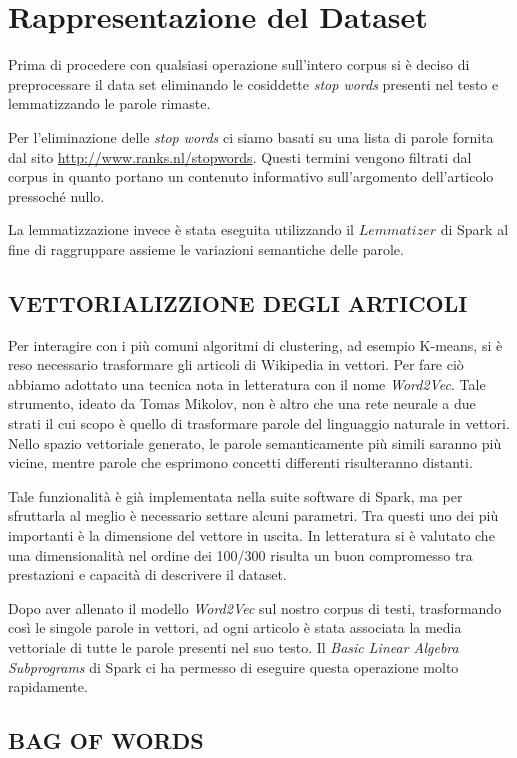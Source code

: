 \documentclass[
	12pt, %
	a4paper, %
	oneside, %
	headinclude,footinclude, %
	BCOR5mm, %
]{scrartcl}
\begin{document}
\section{Rappresentazione del Dataset}
	Prima di procedere con qualsiasi operazione sull'intero corpus si è deciso di preprocessare il data set eliminando le cosiddette \emph{stop words} presenti nel testo e lemmatizzando le parole rimaste.

	Per l'eliminazione delle \emph{stop words} ci siamo basati su una lista di parole fornita dal sito \url{http://www.ranks.nl/stopwords}.
	Questi termini vengono filtrati dal corpus in quanto portano un contenuto informativo sull'argomento dell'articolo pressoch\'{e} nullo.

	La lemmatizzazione invece è stata eseguita utilizzando il $Lemmatizer$ di Spark al fine di raggruppare assieme le variazioni semantiche delle parole.

	\subsection{VETTORIALIZZIONE DEGLI ARTICOLI}
		Per interagire con i più comuni algoritmi di clustering, ad esempio K-means, si è reso necessario trasformare gli articoli di Wikipedia in vettori.
		Per fare ciò abbiamo adottato una tecnica nota in letteratura con il nome \emph{Word2Vec}. Tale strumento, ideato da Tomas Mikolov, non è altro che una rete neurale a due strati il cui scopo è quello di trasformare parole del linguaggio naturale in vettori. Nello spazio vettoriale generato, le parole semanticamente più simili saranno più vicine, mentre parole che esprimono concetti differenti risulteranno distanti.

		Tale funzionalità è già implementata nella suite software di Spark, ma per sfruttarla al meglio è necessario settare alcuni parametri. Tra questi uno dei più importanti è la dimensione del vettore in uscita.
		In letteratura si è valutato che una dimensionalità nel ordine dei 100/300\cite{w2vdim} risulta un buon compromesso tra prestazioni e capacità di descrivere il dataset.

		Dopo aver allenato il modello \emph{Word2Vec} sul nostro corpus di testi, trasformando così le singole parole in vettori, ad ogni articolo è stata associata la media vettoriale di tutte le parole presenti nel suo testo. Il \emph{Basic Linear Algebra Subprograms} di Spark ci ha permesso di eseguire questa operazione molto rapidamente.

	\subsection{BAG OF WORDS} \label{sec:bag_of_words}
\end{document}
